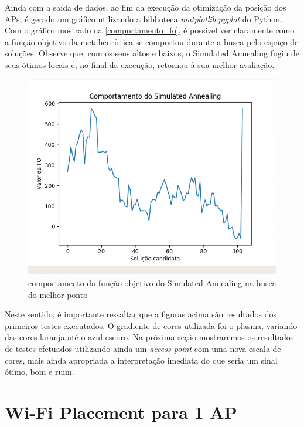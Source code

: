 \documentclass[
	12pt,				%
	openright,			%
	twoside,			%
	a4paper,			%
	english,			%
	french,				%
	spanish,			%
	brazil				%
	]{abntex2}
\begin{document}
Ainda com a saída de dados, ao fim da execução da otimização da posição dos APs, é gerado um gráfico utilizando a biblioteca \textit{matplotlib.pyplot} do Python. Com o gráfico mostrado na \autoref{comportamento_fo}, é possível ver claramente como a função objetivo da metaheurística se comportou durante a busca pelo espaço de soluções. Observe que, com os seus altos e baixos, o Simulated Annealing fugiu de seus ótimos locais e, no final da execução, retornou à sua melhor avaliação.
	
\begin{figure}[ht]
	\caption{\label{comportamento_fo}comportamento da função objetivo do Simulated Annealing na busca do melhor ponto}
	\begin{center}
		\includegraphics[scale=0.5]{images/comportamento-fo.jpg}
	\end{center}
\end{figure}


Neste sentido, é importante ressaltar que a figuras acima são resultados dos primeiros testes executados. O gradiente de cores utilizada foi o plasma, variando das cores laranja até o azul escuro. Na próxima seção mostraremos os resultados de testes efetuados utilizando ainda um \textit{access point} com uma nova escala de cores, mais ainda apropriada a interpretação imediata do que seria um sinal ótimo, bom e ruim. 

\newpage

\section[Wi-Fi Placement para 1 AP]{Wi-Fi Placement para 1 AP}
\end{document}
